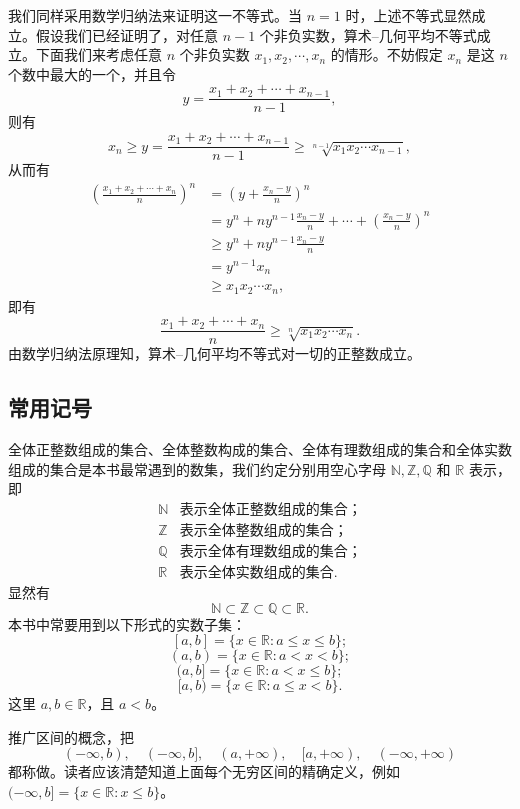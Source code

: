 \documentclass[UTF8,12pt,a4paper,fontset=fandol]{ctexbook}
\begin{document}
\noindent{}\quad 我们同样采用数学归纳法来证明这一不等式。当 $n=1$ 时，上述不等式显然成立。假设我们已经证明了，对任意 $n-1$ 个非负实数，算术--几何平均不等式成立。下面我们来考虑任意 $n$ 个非负实数 $x_1,x_2,\cdots,x_n$ 的情形。不妨假定 $x_n$ 是这 $n$ 个数中最大的一个，并且令
\[
  y=\frac{x_1+x_2+\cdots+x_{n-1}}{n-1},
\]
则有
\[
  x_n\geqslant y=\frac{x_1+x_2+\cdots+x_{n-1}}{n-1}
  \geqslant \sqrt[n-1]{x_1x_2\cdots x_{n-1}},
\]
从而有
\[
\begin{aligned}
  \left(\frac{x_1+x_2+\cdots+x_n}{n}\right)^n
  &=\left(y+\frac{x_n-y}{n}\right)^n\\
  &=y^n+ny^{n-1}\frac{x_n-y}{n}+\cdots+\left(\frac{x_n-y}{n}\right)^n\\
  &\geqslant y^n+ny^{n-1}\frac{x_n-y}{n}\\
  &=y^{n-1}x_n\\
  &\geqslant x_1x_2\cdots x_n,
\end{aligned}
\]
即有
\[
  \frac{x_1+x_2+\cdots+x_n}{n}\geqslant \sqrt[n]{x_1x_2\cdots x_n}.
\]
由数学归纳法原理知，算术--几何平均不等式对一切的正整数成立。

\subsection{常用记号}

全体正整数组成的集合、全体整数构成的集合、全体有理数组成的集合和全体实数组成的集合是本书最常遇到的数集，我们约定分别用空心字母 $\mathbb{N},\mathbb{Z},\mathbb{Q}$ 和 $\mathbb{R}$ 表示，即
\[
\begin{array}{ll}
  \mathbb{N} & \text{表示全体正整数组成的集合；}\\
  \mathbb{Z} & \text{表示全体整数组成的集合；}\\
  \mathbb{Q} & \text{表示全体有理数组成的集合；}\\
  \mathbb{R} & \text{表示全体实数组成的集合.}
\end{array}
\]
显然有
\[
  \mathbb{N}\subset\mathbb{Z}\subset\mathbb{Q}\subset\mathbb{R}.
\]
本书中常要用到以下形式的实数子集：
\[
  [a,b]=\{x\in\mathbb{R}:a\leqslant x\leqslant b\};
\]
\[
  (a,b)=\{x\in\mathbb{R}:a<x<b\};
\]
\[
  (a,b]=\{x\in\mathbb{R}:a<x\leqslant b\};
\]
\[
  [a,b)=\{x\in\mathbb{R}:a\leqslant x<b\}.
\]
这里 $a,b\in\mathbb{R}$，且 $a<b$。

推广区间的概念，把
\[
  (-\infty,b),\quad (-\infty,b],\quad (a,+\infty),\quad [a,+\infty),\quad (-\infty,+\infty)
\]
都称做。读者应该清楚知道上面每个无穷区间的精确定义，例如 $(-\infty,b]=\{x\in\mathbb{R}:x\leqslant b\}$。
\end{document}
